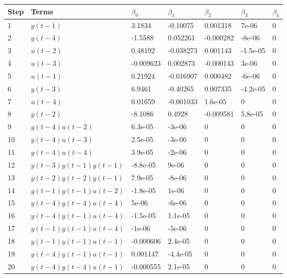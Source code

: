 \begin{tabular}{lllllll}
Step & Terms & $\beta_{0}$ & $\beta_{1}$ & $\beta_{2}$ & $\beta_{3}$ & $\beta_{4}$ \\ 
\hline 
1 & $y(t-1)$ & 3.1834 & -0.10075 & 0.001318 & 7e-06 & 0 \\ 
2 & $y(t-4)$ & -1.5588 & 0.052261 & -0.000282 & -8e-06 & 0 \\ 
3 & $u(t-2)$ & 0.48192 & -0.038273 & 0.001143 & -1.5e-05 & 0 \\ 
4 & $u(t-3)$ & -0.009623 & 0.002873 & -0.000143 & 3e-06 & 0 \\ 
5 & $u(t-1)$ & 0.21924 & -0.016907 & 0.000482 & -6e-06 & 0 \\ 
6 & $y(t-3)$ & 6.9461 & -0.40265 & 0.007335 & -4.2e-05 & 0 \\ 
7 & $u(t-4)$ & 0.01659 & -0.001033 & 1.6e-05 & 0 & 0 \\ 
8 & $y(t-2)$ & -8.1086 & 0.4928 & -0.009581 & 5.8e-05 & 0 \\ 
9 & $y(t-4)u(t-2)$ & 6.3e-05 & -3e-06 & 0 & 0 & 0 \\ 
10 & $y(t-4)u(t-3)$ & 2.5e-05 & -3e-06 & 0 & 0 & 0 \\ 
11 & $y(t-4)u(t-4)$ & 3.9e-05 & -2e-06 & 0 & 0 & 0 \\ 
12 & $y(t-3)y(t-1)y(t-1)$ & -8.8e-05 & 9e-06 & 0 & 0 & 0 \\ 
13 & $y(t-2)y(t-2)y(t-1)$ & 7.9e-05 & -8e-06 & 0 & 0 & 0 \\ 
14 & $y(t-1)y(t-1)u(t-2)$ & -1.8e-05 & 1e-06 & 0 & 0 & 0 \\ 
15 & $y(t-4)y(t-4)u(t-4)$ & 5e-06 & -6e-06 & 0 & 0 & 0 \\ 
16 & $y(t-4)y(t-1)u(t-4)$ & -1.5e-05 & 1.1e-05 & 0 & 0 & 0 \\ 
17 & $y(t-1)y(t-1)u(t-4)$ & -1e-06 & -5e-06 & 0 & 0 & 0 \\ 
18 & $y(t-1)y(t-1)u(t-1)$ & -0.000606 & 2.4e-05 & 0 & 0 & 0 \\ 
19 & $y(t-4)y(t-1)u(t-1)$ & 0.001147 & -4.4e-05 & 0 & 0 & 0 \\ 
20 & $y(t-4)y(t-4)u(t-1)$ & -0.000555 & 2.1e-05 & 0 & 0 & 0 \\ 
\hline 
\end{tabular}